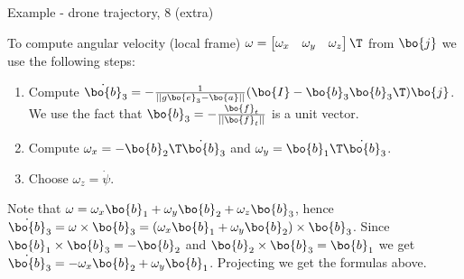 \begin{frame}{Example - drone trajectory, 8 (extra)}
	\begin{flushleft}
		
		
		To compute angular velocity (local frame) $\omega = \begin{bmatrix}
		\omega_x & \omega_y & \omega_z
		\end{bmatrix}\T$ from $\bo{j}$ we use the following steps:
		
		\begin{enumerate}
			
			\item Compute $\dot{ \bo{b}}_3 =  -\frac{1}{||g \bo{e}_3 - \bo{a}||}(\bo{I} - \bo{b}_3 \bo{b}_3\T) \bo{j}$. \textcolor{mygray}{ We use the fact that $\bo{b}_3 = -\frac{\bo{f}_t}{||\bo{f}_t||}$ is a unit vector.}
			
			\item Compute $\omega_x = - \bo{b}_2\T \dot{ \bo{b}}_3$ and $\omega_y = \bo{b}_1\T \dot{ \bo{b}}_3$.
			
			\item Choose $\omega_z = \dot \psi$.
		\end{enumerate}
		
		\bigskip
		
		\textcolor{mygray2}{
		Note that $\omega = \omega_x \bo{b}_1 + \omega_y \bo{b}_2+ \omega_z \bo{b}_3$, hence $\dot{ \bo{b}}_3  = \omega \times \bo{b}_3 = ( \omega_x \bo{b}_1 + \omega_y \bo{b}_2) \times \bo{b}_3$. Since $ \bo{b}_1 \times  \bo{b}_3 =  -\bo{b}_2$ and $ \bo{b}_2 \times  \bo{b}_3 =  \bo{b}_1$ we get $\dot{ \bo{b}}_3  =  -\omega_x \bo{b}_2+ \omega_y \bo{b}_1$. Projecting we get the formulas above.}
		
	\end{flushleft}
\end{frame}